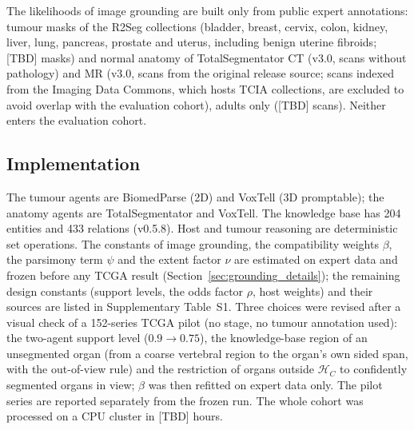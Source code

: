 \documentclass[fleqn,10pt]{olplainarticle}
\begin{document}
The likelihoods of image grounding are built only from public expert annotations: tumour masks of the R2Seg collections
(bladder, breast, cervix, colon, kidney, liver, lung, pancreas, prostate and uterus, including benign uterine fibroids;
[TBD] masks) and normal anatomy of
TotalSegmentator CT (v3.0, scans without pathology) and MR (v3.0, scans from the original release source; scans indexed from the
Imaging Data Commons, which hosts TCIA collections, are excluded to avoid overlap with the evaluation cohort), adults only ([TBD] scans). Neither enters the evaluation cohort.

\subsection{Implementation}
The tumour agents are BiomedParse (2D) and VoxTell (3D promptable); the anatomy agents are TotalSegmentator and VoxTell. The
knowledge base has 204 entities and 433 relations (v0.5.8). Host and tumour reasoning are deterministic set operations.
The constants of image grounding, the compatibility weights $\beta$, the parsimony term $\psi$ and the extent factor $\nu$
are estimated on expert data and frozen before any TCGA result (Section~\ref{sec:grounding_details}); the remaining design
constants (support levels, the odds factor $\rho$, host weights) and their sources are listed in Supplementary Table~S1. Three choices were revised after a visual check of a 152-series TCGA pilot (no stage, no tumour annotation used): the two-agent support level ($0.9\to0.75$), the knowledge-base region of an unsegmented organ (from a coarse vertebral region to the organ's own sided span, with the out-of-view rule) and the restriction of organs outside $\mathcal{H}_C$ to confidently segmented organs in view; $\beta$ was then refitted on expert data only. The pilot series are reported separately from the frozen run. The whole cohort was processed on a CPU cluster in [TBD] hours.
\end{document}
